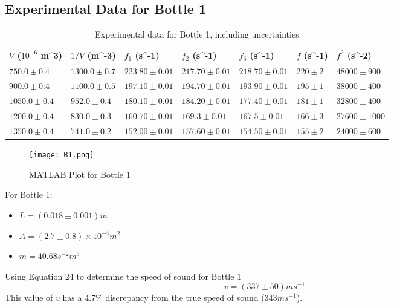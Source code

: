 \documentclass[10pt, a4paper]{article}
\begin{document}
\subsection*{Experimental Data for Bottle 1}
\begin{table}[H]
\centering
\def\arraystretch{1.6}
\begin{tabular}{|l|l|l|l|l|l|l|}
\hline
$V$ ($10^{-6}$ m^3) & $1/V$ (m^{-3}) & $f_1$ (s^{-1})        & $f_2$ (s^{-1})        & $f_3$ (s^{-1})        & $f$ (s^{-1}) & $f^2$ (s^{-2})   \\ \hline
$750.0 \pm 0.4$                                         & $1300.0 \pm 0.7$                   & $223.80 \pm 0.01$ & $217.70 \pm 0.01$ & $218.70 \pm 0.01$ & $220 \pm 2$ & $48000 \pm 900$ \\ \hline
$900.0 \pm 0.4$                                         & $1100.0 \pm 0.5$                   & $197.10 \pm 0.01$ & $194.70 \pm 0.01$ & $193.90 \pm 0.01$ & $195 \pm 1$ & $38000 \pm 400$ \\ \hline
$1050.0 \pm 0.4$                                        & $952.0 \pm 0.4$                    & $180.10 \pm 0.01$ & $184.20 \pm 0.01$ & $177.40 \pm 0.01$ & $181 \pm 1$ & $32800 \pm 400$ \\ \hline
$1200.0 \pm 0.4$                                        & $830.0 \pm 0.3$                    & $160.70 \pm 0.01$ & $169.3 \pm 0.01$  & $167.5 \pm 0.01$  & $166 \pm 3$ & $27600 \pm 1000$  \\ \hline
$1350.0 \pm 0.4$                                        & $741.0 \pm 0.2$                    & $152.00 \pm 0.01$ & $157.60 \pm 0.01$ & $154.50 \pm 0.01$ & $155 \pm 2$ & $24000 \pm 600$ \\ \hline
\end{tabular}
\caption {Experimental data for Bottle 1, including uncertainties}
\end{table}

\begin{figure}[H]
    \centering
    \texttt{[image: B1.png]}
    \caption{MATLAB Plot for Bottle 1}
\end{figure}

For Bottle 1: 
\begin{itemize}
\item $L = (0.018 \pm 0.001) \si{m}$ 
\item $A = (2.7 \pm 0.8) \times 10^{-4}\si{m^2}$
\item $m = 40.68 \si{s^{-2}m^{3}}$
\end{itemize}
Using Equation 24 to determine the speed of sound for Bottle 1
$$\boxed{v = (337 \pm 50) \si{ms^{-1}}}$$
This value of $v$ has a 4.7\% discrepancy from the true speed of sound ($343 \si{ms^{-1}}$).
\end{document}
